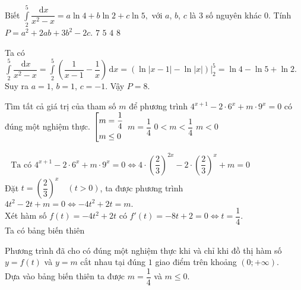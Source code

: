 \begin{ex}%
	Biết $ \displaystyle \int\limits_{2}^{5} \dfrac{\mathrm{\,d}x}{x^2-x} = a \ln4 + b \ln 2 + c \ln 5, $ với $ a $, $ b $, $ c $ là $ 3 $ số nguyên khác $ 0 $. Tính $ P = a^2 + 2ab +3b^2 -2c. $
	\choice
	{$ 7 $}
	{$ 5 $}
	{$ 4 $}
	{\True $ 8 $}
	\loigiai
	{Ta có $ \displaystyle \int\limits_{2}^{5} \dfrac{\mathrm{\,d}x}{x^2-x} =  \displaystyle \int\limits_{2}^{5} \left(\dfrac{1}{x-1} - \dfrac{1}{x}\right) \mathrm{\,d}x= \left(\ln\left|x-1\right| - \ln \left|x \right| \right)\bigg|_2^5 = \ln 4 - \ln 5 + \ln 2.$\\
		Suy ra $ a = 1 $, $ b = 1 $, $ c = -1. $ Vậy $ P = 8. $
		
	}
\end{ex}
\begin{ex}%
	Tìm tất cả giá trị của tham số $ m $	 để phương trình $ 4^{x+1} - 2 \cdot 6^x + m \cdot 9^x = 0 $ có đúng một nghiệm thực.
	\choice
	{\True $ \left[\begin{aligned}&m = \dfrac{1}{4} \\ &m \le 0\end{aligned}\right. $}
	{$ m = \dfrac{1}{4} $}
	{$ 0 < m < \dfrac{1}{4} $}
	{$ m < 0 $}
	\loigiai
	{$ \begin{aligned}
		\text{ Ta có }  4^{x+1} - 2 \cdot 6^x + m \cdot 9^x = 0 \Leftrightarrow 4 \cdot \left(\dfrac{2}{3}\right)^{2x} -2 \cdot \left(\dfrac{2}{3}\right)^x + m = 0
		\end{aligned} $\\
		Đặt $ t = \left(\dfrac{2}{3}\right)^x \quad \left(t>0\right) $, ta được phương trình $ 4t^2 -2t + m =0 \Leftrightarrow -4t^2 + 2t = m. $
		\\Xét hàm số $ f(t) = -4t^2 + 2t $ có $ f'(t) = -8t + 2 = 0 \Leftrightarrow t = \dfrac{1}{4} $.\\
		Ta có bảng biến thiên
		\begin{center}
		\end{center}
		Phương trình đã cho có đúng một nghiệm thực khi và chỉ khi đồ thị hàm số $ y = f(t) $ và $ y = m $	cắt nhau tại đúng $ 1 $ giao điểm trên khoảng $ \left(0;+\infty\right) $.\\
		Dựa vào bảng biến thiên ta được $ m = \dfrac{1}{4} $ và $ m \le 0 $.
		
	}
\end{ex}

